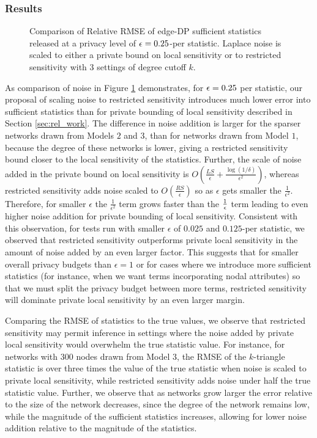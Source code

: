  \subsubsection{Results}
 \begin{figure}[hp]
 	\caption{Comparison of Relative RMSE of edge-DP sufficient statistics released at a privacy level of $\epsilon = 0.25$-per statistic. Laplace noise is scaled to either a private bound on local sensitivity or to restricted sensitivity with $3$ settings of degree cutoff $k$.}
 	\label{fig:edge_noise}
 	\centering
 	

 \end{figure}
 
As comparison of noise in Figure \ref{fig:edge_noise} demonstrates, for $\epsilon = 0.25$ per statistic, our proposal of scaling noise to restricted sensitivity introduces much lower error into sufficient statistics than for private bounding of local sensitivity described in Section \ref{sec:rel_work}. The difference in noise addition is larger for the sparser networks drawn from Models $2$ and $3$, than for networks drawn from Model $1$, because the degree of these networks is lower, giving a restricted sensitivity bound closer to the local sensitivity of the statistics. Further, the scale of noise added in the private bound on local sensitivity is $O\left(\frac{LS}{\epsilon} + \frac{\log(1/\delta)}{\epsilon^2}\right)$, whereas restricted sensitivity adds noise scaled to $O\left(\frac{RS}{\epsilon}\right)$ so as $\epsilon$ gets smaller the $\frac{1}{\epsilon^2}$. Therefore, for smaller $\epsilon$ the $\frac{1}{\epsilon^2}$ term grows faster than the $\frac{1}{\epsilon}$ term leading to even higher noise addition for private bounding of local sensitivity. Consistent with this observation, for tests run with smaller $\epsilon$ of $0.025$ and $0.125$-per statistic, we observed that restricted sensitivity outperforms private local sensitivity in the amount of noise added by an even larger factor. This suggests that for smaller overall privacy budgets than $\epsilon=1$ or for cases where we introduce more sufficient statistics (for instance, when we want terms incorporating nodal attributes) so that we must split the privacy budget between more terms, restricted sensitivity will dominate private local sensitivity by an even larger margin.

Comparing the RMSE of statistics to the true values, we observe that restricted sensitivity may permit inference in settings where the noise added by private local sensitivity would overwhelm the true statistic value. For instance, for networks with $300$ nodes drawn from Model $3$, the RMSE of the $k$-triangle statistic is over three times the value of the true statistic when noise is scaled to private local sensitivity, while restricted sensitivity adds noise under half the true statistic value. Further, we observe that as networks grow larger the error relative to the size of the network decreases, since the degree of the network remains low, while the magnitude of the sufficient statistics increases, allowing for lower noise addition relative to the magnitude of the statistics.

